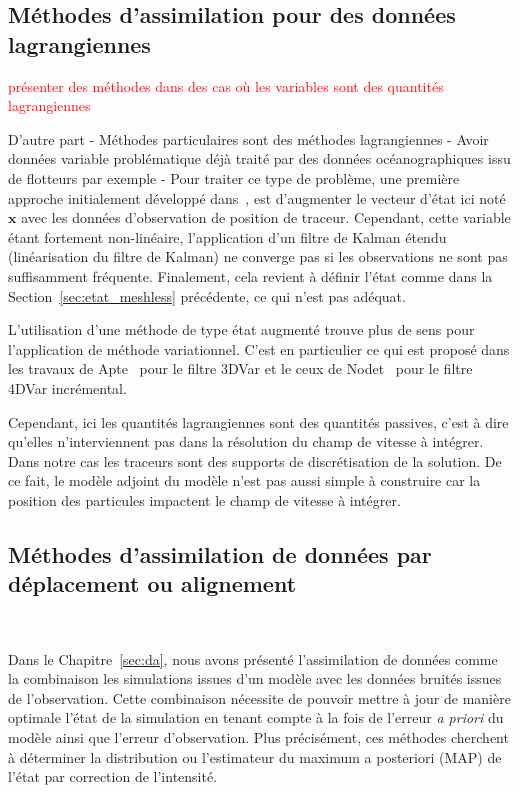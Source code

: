 \subsection{Méthodes d'assimilation pour des données lagrangiennes}
\textcolor{red}{présenter des méthodes dans des cas où les variables sont des quantités lagrangiennes}

D'autre part
- Méthodes particulaires sont des méthodes lagrangiennes
- Avoir données variable problématique déjà traité par des données océanographiques issu de flotteurs par exemple
- Pour traiter ce type de problème, une première approche initialement développé dans~\cite{ide_2002}, est d'augmenter le vecteur d'état ici noté $\bm x$ avec les données d'observation de position de traceur. Cependant, cette variable étant fortement non-linéaire, l'application d'un filtre de Kalman étendu (linéarisation du filtre de Kalman) ne converge pas si les observations ne sont pas suffisamment fréquente. Finalement, cela revient à définir l'état comme dans la Section~\ref{sec:etat_meshless} précédente, ce qui n'est pas adéquat.

L'utilisation d'une méthode de type état augmenté trouve plus de sens pour l'application de méthode variationnel.
C'est en particulier ce qui est proposé dans les travaux de Apte~\cite{apte_2008} pour le filtre 3DVar et le ceux de Nodet~\cite{nodet_2006} pour le filtre 4DVar incrémental.

Cependant, ici les quantités lagrangiennes sont des quantités passives, c'est à dire qu'elles n'interviennent pas dans la résolution du champ de vitesse à intégrer. Dans notre cas les traceurs sont des supports de discrétisation de la solution. De ce fait, le modèle adjoint du modèle n'est pas aussi simple à construire car la position des particules impactent le champ de vitesse à intégrer.


\subsection{Méthodes d'assimilation de données par déplacement ou alignement}~\label{sec:biblio_align}

Dans le Chapitre~\ref{sec:da}, nous avons présenté l'assimilation de données comme la combinaison les simulations issues d'un modèle avec les données bruités issues de l'observation. Cette combinaison nécessite de pouvoir mettre à jour de manière optimale l'état de la simulation en tenant compte à la fois de l'erreur \textit{a priori} du modèle ainsi que l'erreur d'observation. Plus précisément, ces méthodes cherchent à déterminer la distribution ou l'estimateur du maximum a posteriori (MAP) de l'état par correction de l'intensité.

